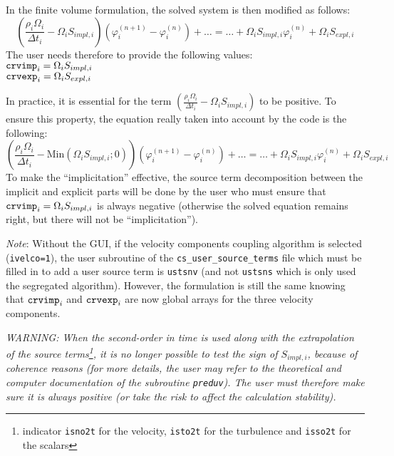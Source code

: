 {{{In the finite volume formulation, the solved system is then modified as
follows:
\begin{displaymath}
\left(\frac{\rho_i\Omega_i}{\Delta t_i}-\Omega_iS_{impl,i}\right)
\left(\varphi_i^{(n+1)}-\varphi_i^{(n)}\right)
+\ldots = \ldots + \Omega_iS_{impl,i}\varphi_i^{(n)} + \Omega_iS_{expl,i}
\end{displaymath}
The user needs therefore to provide the following values:\\
$\text{\texttt{crvimp}}_i=\Omega_iS_{impl,i}$\\
$\text{\texttt{crvexp}}_i=\Omega_iS_{expl,i}$

In practice, it is essential for the term
$\displaystyle \left(\frac{\rho_i\Omega_i}{\Delta
t_i}-\Omega_iS_{impl,i}\right)$ to be positive. To ensure this property,
the equation really taken into account by the code is the following:
\begin{displaymath}
\left(\frac{\rho_i\Omega_i}{\Delta t_i}-
\text{Min}(\Omega_iS_{impl,i};0)\right)
\left(\varphi_i^{(n+1)}-\varphi_i^{(n)}\right)
+\ldots = \ldots + \Omega_iS_{impl,i}\varphi_i^{(n)} + \Omega_iS_{expl,i}
\end{displaymath}
To make the ``implicitation'' effective, the source term decomposition
between the implicit and explicit parts will be done by the user who must
ensure that $\text{\texttt{crvimp}}_i=\Omega_iS_{impl,i}$ is always negative
(otherwise the solved equation remains right, but there will not be
``implicitation'').

{\em Note}: Without the GUI, if the velocity components coupling algorithm is selected (\texttt{ivelco=1}), the user subroutine of
the \texttt{cs\_user\_source\_terms} file which must be filled in to add a user source term is \texttt{ustsnv} (and not \texttt{ustsns}
which is only used the segregated algorithm). However, the formulation is still the same knowing that $\text{\texttt{crvimp}}_i$ and
$\text{\texttt{crvexp}}_i$ are now global arrays for the three velocity components.

{\em WARNING: When the second-order in time is used along with the extrapolation of the
source terms\footnote{indicator \texttt{isno2t} for the velocity,
\texttt{isto2t} for the turbulence and \texttt{isso2t} for the scalars}, it is no longer possible to test the sign of $S_{impl,i}$,
because of coherence reasons (for more details, the user may refer to
the theoretical and computer documentation \cite{theory} of the
subroutine \texttt{preduv}). The user must therefore make sure it is
always positive (or take the risk to affect the calculation stability).}

}}}
